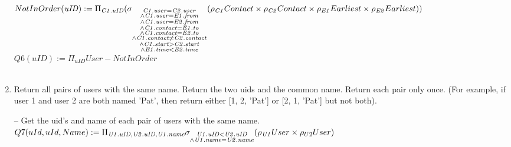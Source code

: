 \documentclass{article}
\newcommand{\var}[1]{\mathit{#1}}
\begin{document}
\begin{enumerate}
{$
NotInOrder(\var{uID}) := \\ [5pt]
	\Pi_{\var{C1.uID}}
	(\sigma_{\substack{\var{C1.user} = \var{C2.user} \\
		\wedge \var{C1.user} = \var{E1.from} \\
		\wedge \var{C1.user} = \var{E2.from} \\
		\wedge \var{C1.contact} = \var{E1.to} \\
		\wedge \var{C1.contact} = \var{E2.to} \\
		\wedge \var{C1.contact} \neq \var{C2.contact} \\
		\wedge \var{C1.start} > \var{C2.start} \\
		\wedge \var{E1.time} < \var{E2.time}}}
		(\rho_{\var{C1}} Contact \times \rho_{\var{C2}} Contact
		\times \rho_{\var{E1}} Earliest \times \rho_{\var{E2}} Earliest)) \\ [5pt]
$
$
Q6(uID) := 
	\Pi_{\var{uID}} User - NotInOrder 
$\\\\
}

\item   %
Return all pairs of users with the same name. Return the two uids and the common name. Return each pair only once. (For example, if user 1 and user 2 are both named 'Pat', then return either [1, 2, 'Pat'] or [2, 1, 'Pat'] but not both). \\ [5pt]
{\large
\hspace*{1cm} -- Get the uid's and name of each pair of users with the same name. \\ [5 pt]
$
Q7(uId, uId, Name) := \Pi_{\var{U1.uID}, \var{U2.uID}, \var{U1.name}}
	 \sigma_{\substack{{\var{U1.uID}}  <  \var{U2.uID} \\
	  \wedge \var{U1.name} = \var{U2.name}}} (\rho_{\var{U1}} User \times \rho_{U2}User) \\ [5pt]
$

}
\end{enumerate}
\end{document}
